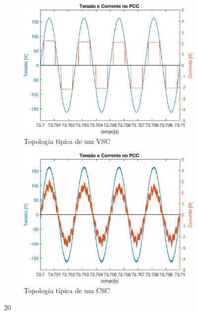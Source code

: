 \begin{figure}[!htb] %
	\centering
	\begin{subfigure}[b]{0.48\textwidth}
		\centering
		\includegraphics[width=\textwidth]{Cap4/Figuras/resultados_unfilt_20.eps}
		\caption{Topologia típica de um VSC} 
		\label{fig:resultados_unfilt_20.eps}
	\end{subfigure}%
		\hfill
	\begin{subfigure}[b]{0.48\textwidth}  
		\centering 
		\includegraphics[width=\textwidth]{Cap4/Figuras/resultados_filt_20.eps}
		\caption{Topologia típica de um CSC}    
		\label{fig:resultados_filt_20.eps}
	\end{subfigure}%
	\caption{20}
	\label{fig:20}
\end{figure}

